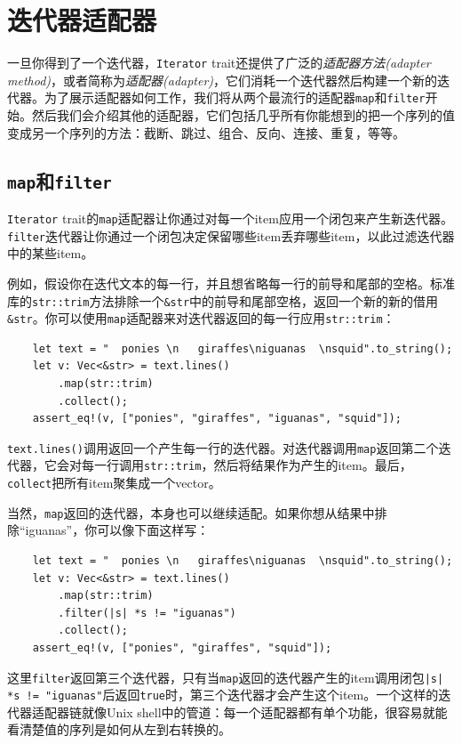 \section{迭代器适配器}

一旦你得到了一个迭代器，\texttt{Iterator} trait还提供了广泛的\emph{适配器方法(adapter method)}，或者简称为\emph{适配器(adapter)}，它们消耗一个迭代器然后构建一个新的迭代器。为了展示适配器如何工作，我们将从两个最流行的适配器\texttt{map}和\texttt{filter}开始。然后我们会介绍其他的适配器，它们包括几乎所有你能想到的把一个序列的值变成另一个序列的方法：截断、跳过、组合、反向、连接、重复，等等。

\subsection{\texttt{map}和\texttt{filter}}
\texttt{Iterator} trait的\texttt{map}适配器让你通过对每一个item应用一个闭包来产生新迭代器。\texttt{filter}迭代器让你通过一个闭包决定保留哪些item丢弃哪些item，以此过滤迭代器中的某些item。

例如，假设你在迭代文本的每一行，并且想省略每一行的前导和尾部的空格。标准库的\texttt{str::trim}方法排除一个\texttt{\&str}中的前导和尾部空格，返回一个新的新的借用\texttt{\&str}。你可以使用\texttt{map}适配器来对迭代器返回的每一行应用\texttt{str::trim}：
\begin{verbatim}
    let text = "  ponies \n   giraffes\niguanas  \nsquid".to_string();
    let v: Vec<&str> = text.lines()
        .map(str::trim)
        .collect();
    assert_eq!(v, ["ponies", "giraffes", "iguanas", "squid"]);
\end{verbatim}

\texttt{text.lines()}调用返回一个产生每一行的迭代器。对迭代器调用\texttt{map}返回第二个迭代器，它会对每一行调用\texttt{str::trim}，然后将结果作为产生的item。最后，\texttt{collect}把所有item聚集成一个vector。

当然，\texttt{map}返回的迭代器，本身也可以继续适配。如果你想从结果中排除“iguanas”，你可以像下面这样写：
\begin{verbatim}
    let text = "  ponies \n   giraffes\niguanas  \nsquid".to_string();
    let v: Vec<&str> = text.lines()
        .map(str::trim)
        .filter(|s| *s != "iguanas")
        .collect();
    assert_eq!(v, ["ponies", "giraffes", "squid"]);
\end{verbatim}

这里\texttt{filter}返回第三个迭代器，只有当\texttt{map}返回的迭代器产生的item调用闭包\texttt{|s| *s != "iguanas"}后返回\texttt{true}时，第三个迭代器才会产生这个item。一个这样的迭代器适配器链就像Unix shell中的管道：每一个适配器都有单个功能，很容易就能看清楚值的序列是如何从左到右转换的。

